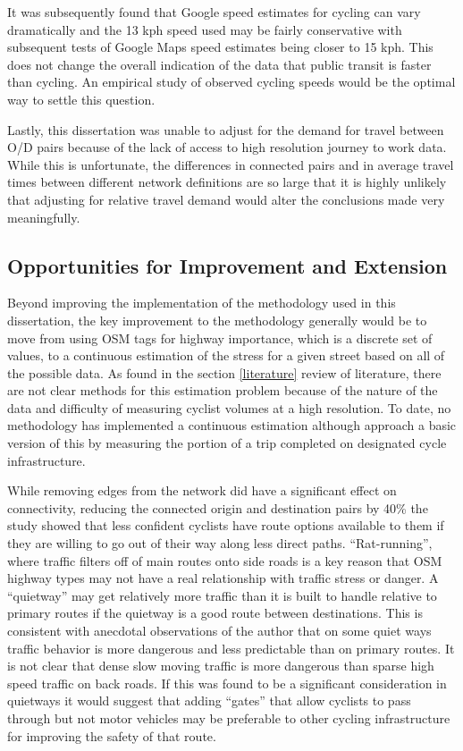 It was subsequently found that Google speed estimates for cycling can vary dramatically and the 13 kph speed used may be fairly conservative with subsequent tests of Google Maps speed estimates being closer to 15 kph. This does not change the overall indication of the data that public transit is faster than cycling. An empirical study of observed cycling speeds would be the optimal way to settle this question. 

Lastly, this dissertation was unable to adjust for the demand for travel between O/D pairs because of the lack of access to high resolution journey to work data. While this is unfortunate, the differences in connected pairs and in average travel times between different network definitions are so large that it is highly unlikely that adjusting for relative travel demand would alter the conclusions made very meaningfully. 

\subsection{Opportunities for Improvement and Extension}

Beyond improving the implementation of the methodology used in this dissertation, the key improvement to the methodology generally would be to move from using OSM tags for highway importance, which is a discrete set of values, to a continuous estimation of the stress for a given street based on all of the possible data. As found in the section \ref{literature} review of literature, there are not clear methods for this estimation problem because of the nature of the data and difficulty of measuring cyclist volumes at a high resolution. To date, no methodology has implemented a continuous estimation although \textcite{boisjoly2019bicycle} approach a basic version of this by measuring the portion of a trip completed on designated cycle infrastructure. 

While removing edges from the network did have a significant effect on connectivity, reducing the connected origin and destination pairs by 40\% the study showed that less confident cyclists have route options available to them if they are willing to go out of their way along less direct paths. ``Rat-running'', where traffic filters off of main routes onto side roads is a key reason that OSM highway types may not have a real relationship with traffic stress or danger. A ``quietway'' may get relatively more traffic than it is built to handle relative to primary routes if the quietway is a good route between destinations. This is consistent with anecdotal observations of the author that on some quiet ways traffic behavior is more dangerous and less predictable than on primary routes. It is not clear that dense slow moving traffic is more dangerous than sparse high speed traffic on back roads. If this was found to be a significant consideration in quietways it would suggest that adding ``gates'' that allow cyclists to pass through  but not motor vehicles may be preferable to other cycling infrastructure for improving the safety of that route.

